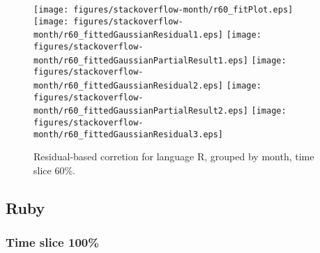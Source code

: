 \begin{figure}[hb]
\centering
{}
{\texttt{[image: figures/stackoverflow-month/r60\_fitPlot.eps]}}
{\texttt{[image: figures/stackoverflow-month/r60\_fittedGaussianResidual1.eps]}}
{\texttt{[image: figures/stackoverflow-month/r60\_fittedGaussianPartialResult1.eps]}}
{\texttt{[image: figures/stackoverflow-month/r60\_fittedGaussianResidual2.eps]}}
{\texttt{[image: figures/stackoverflow-month/r60\_fittedGaussianPartialResult2.eps]}}
{\texttt{[image: figures/stackoverflow-month/r60\_fittedGaussianResidual3.eps]}}
\caption{Residual-based corretion for language R, grouped by month, time slice 60\%.}
\end{figure}


\clearpage 
\newpage 


\subsection{Ruby}

\FloatBarrier

\subsubsection{Time slice 100\%}

